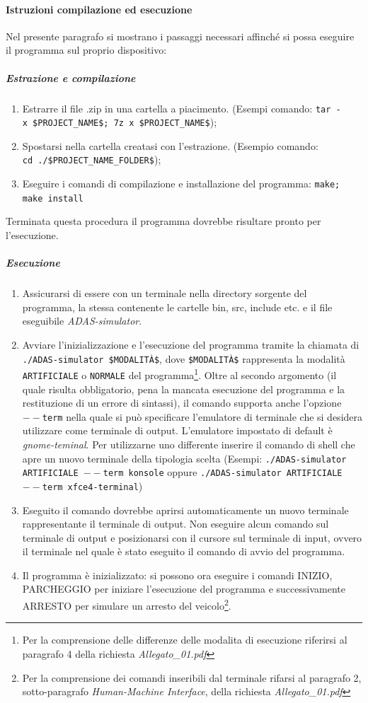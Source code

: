 \documentclass[11pt, openany]{article}
\theoremstyle{definition}
\theoremstyle{plain}
\theoremstyle{remark}
\begin{document}
		\paragraph{Istruzioni compilazione ed esecuzione}
			Nel presente paragrafo si mostrano i passaggi necessari affinché si possa eseguire il programma sul proprio dispositivo:
			\subparagraph{Estrazione e compilazione}
				\begin{enumerate}
					\item Estrarre il file .zip in una cartella a piacimento. (Esempi comando: \texttt{tar~-x~\$PROJECT\_NAME\$; \texttt{7z~x~\$PROJECT\_NAME\$}});
					\item Spostarsi nella cartella creatasi con l'estrazione. (Esempio comando: \texttt{cd~./\$PROJECT\_NAME\_FOLDER\$});
					\item Eseguire i comandi di compilazione e  installazione del programma: \texttt{make; make install}
				\end{enumerate}
				Terminata questa procedura il programma dovrebbe risultare pronto per l'esecuzione.
				\subparagraph{Esecuzione}
					\begin{enumerate}
						\item Assicurarsi di essere con un terminale nella directory sorgente del programma, la stessa contenente le cartelle bin, src, include etc. e il file eseguibile \textit{ADAS-simulator}.
						\item Avviare l'inizializzazione e l'esecuzione del programma tramite la chiamata di \texttt{./ADAS-simulator \$MODALITÀ\$}, dove \texttt{\$MODALITÀ\$} rappresenta la modalità \texttt{ARTIFICIALE} o \texttt{NORMALE} del programma\footnote{Per la comprensione delle differenze delle modalita di esecuzione riferirsi al paragrafo 4 della richiesta \textit{Allegato\_01.pdf}}.
						Oltre al secondo argomento (il quale risulta obbligatorio, pena la mancata esecuzione del programma e la restituzione di un errore di sintassi), il comando supporta anche l'opzione \texttt{$--$term} nella quale si può specificare l'emulatore di terminale che si desidera utilizzare come terminale di output. L'emulatore impostato di default è \textit{gnome-teminal}. Per utilizzarne uno differente inserire il comando di shell che apre un nuovo terminale della tipologia scelta (Esempi: \texttt{./ADAS-simulator ARTIFICIALE $--$term konsole} oppure \texttt{./ADAS-simulator ARTIFICIALE $--$term xfce4-terminal})
						\item Eseguito il comando dovrebbe aprirsi automaticamente un nuovo terminale rappresentante il terminale di output. Non eseguire alcun comando sul terminale di output e posizionarsi con il cursore sul terminale di input, ovvero il terminale nel quale è stato eseguito il comando di avvio del programma.
						\item Il programma è inizializzato: si possono ora eseguire i comandi INIZIO, PARCHEGGIO per iniziare l'esecuzione del programma e successivamente ARRESTO per simulare un arresto del veicolo\footnote{Per la comprensione dei comandi inseribili dal terminale rifarsi al paragrafo 2, sotto-paragrafo \textit{Human-Machine Interface}, della richiesta \textit{Allegato\_01.pdf}}.
				\end{enumerate}
\end{document}
